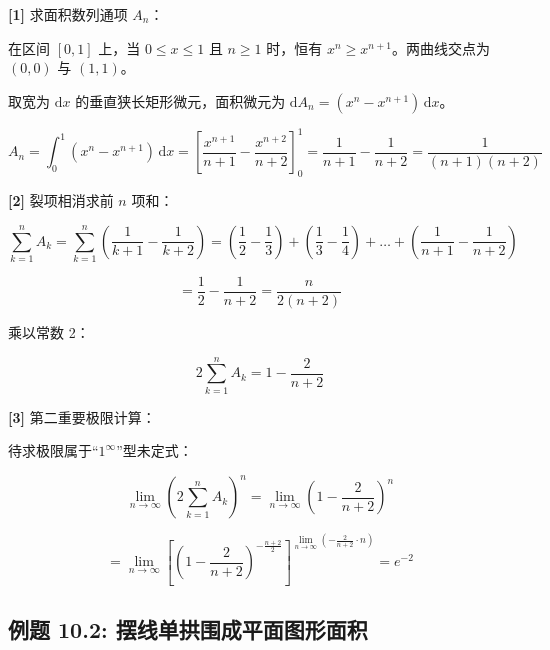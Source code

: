 \documentclass[11pt,a4paper,UTF8]{ctexart}
\begin{document}
\begin{solbox}[分步推导与答题规范]
\textbf{[1]} 求面积数列通项 $A_n$：

在区间 $[0, 1]$ 上，当 $0 \leqslant x \leqslant 1$ 且 $n \geqslant 1$ 时，恒有 $x^n \geqslant x^{n+1}$。两曲线交点为 $(0, 0)$ 与 $(1, 1)$。

取宽为 $\mathrm{d}x$ 的垂直狭长矩形微元，面积微元为 $\mathrm{d}A_n = (x^n - x^{n+1})\,\mathrm{d}x$。


\begin{equation*}
A_n = \int_0^1 (x^n - x^{n+1})\,\mathrm{d}x = \left[\frac{x^{n+1}}{n+1} - \frac{x^{n+2}}{n+2}\right]_0^1 = \frac{1}{n+1} - \frac{1}{n+2} = \frac{1}{(n+1)(n+2)}
\end{equation*}


\textbf{[2]} 裂项相消求前 $n$ 项和：


\begin{equation*}
\sum_{k=1}^n A_k = \sum_{k=1}^n \left(\frac{1}{k+1} - \frac{1}{k+2}\right) = \left(\frac{1}{2} - \frac{1}{3}\right) + \left(\frac{1}{3} - \frac{1}{4}\right) + \dots + \left(\frac{1}{n+1} - \frac{1}{n+2}\right)
\end{equation*}



\begin{equation*}
= \frac{1}{2} - \frac{1}{n+2} = \frac{n}{2(n+2)}
\end{equation*}


乘以常数 2：


\begin{equation*}
2\sum_{k=1}^n A_k = 1 - \frac{2}{n+2}
\end{equation*}


\textbf{[3]} 第二重要极限计算：

待求极限属于“$1^\infty$”型未定式：


\begin{equation*}
\lim_{n \to \infty} \left(2\sum_{k=1}^n A_k\right)^n = \lim_{n \to \infty} \left(1 - \frac{2}{n+2}\right)^n
\end{equation*}



\begin{equation*}
= \lim_{n \to \infty} \left[\left(1 - \frac{2}{n+2}\right)^{-\frac{n+2}{2}}\right]^{\lim\limits_{n \to \infty} \left(-\frac{2}{n+2} \cdot n\right)} = e^{-2}
\end{equation*}

\end{solbox}


\subsection{例题 10.2: 摆线单拱围成平面图形面积}
\end{document}
